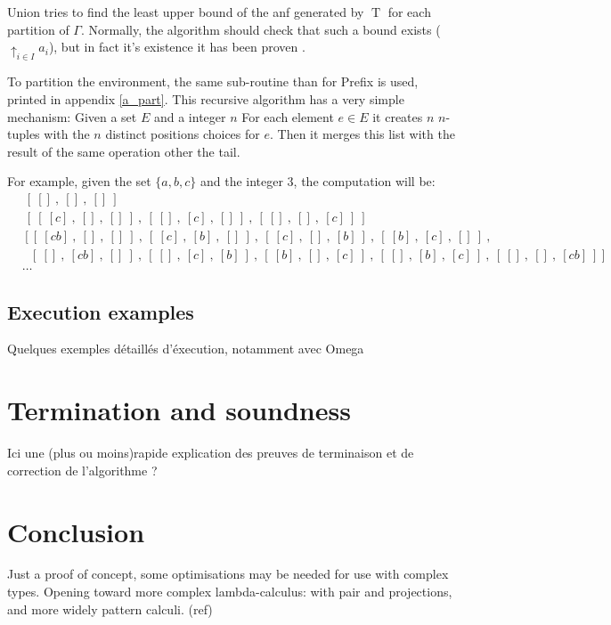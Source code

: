 \documentclass{article}
\DeclareMathOperator{\iT}{T}
\begin{document}
Union tries to find the least upper bound of the anf generated by $\iT$ for each partition of $\Gamma$. Normally, the algorithm should check that such a bound exists ($\uparrow_{i \in I}a_i$), but in fact it's existence it has been proven \cite{Kes}.

To partition the environment, the same sub-routine than for Prefix is used, printed in appendix \ref{a_part}. This recursive algorithm has a very simple mechanism:
Given a set $E$ and a integer $n$ For each element $e\in E$ it creates $n$ $n$-tuples with the $n$ distinct positions choices for $e$. Then it merges this list with the result of the same operation other the tail.

For example, given the set $\{a,b,c\}$ and the integer 3, the computation will be:
\begin{align*}
    &\ [\ []\ ,\ []\ ,\ []\ ]\ &
    \\&\ [\ [\ [c]\ ,\ []\ ,\ []\ ]\ ,\ [\ []\ ,\ [c]\ ,\ []\ ]\ ,\ [\ []\ ,\ []\ ,\ [c]\ ]\ ]\ &
    \\&\ [\ [\ [cb]\ ,\ []\ ,\ []\ ]\ ,\ [\ [c]\ ,\ [b]\ ,\ []\ ]\ ,\ [\ [c]\ ,\ []\ ,\ [b]\ ]\ ,
    \ [\ [b]\ ,\ [c]\ ,\ []\ ]\ ,&
    \\&\ \ \ [\ []\ ,\ [cb]\ ,\ []\ ]\ ,\ [\ []\ ,\ [c]\ ,\ [b]\ ]\ ,
    \ [\ [b]\ ,\ []\ ,\ [c]\ ]\ ,\ [\ []\ ,\ [b]\ ,\ [c]\ ]\ ,\ [\ []\ ,\ []\ ,\ [cb]\ ]\  ]&
    \\&\ldots&
\end{align*}

\subsection{Execution examples}
Quelques exemples détaillés d'éxecution, notamment avec Omega
\section{Termination and soundness}
Ici une (plus ou moins)rapide explication des preuves de terminaison et de correction de l'algorithme ?
\section{Conclusion}
Just a proof of concept, some optimisations may be needed for use with complex types.
Opening toward more complex lambda-calculus: with pair and projections, and more widely pattern calculi. (ref)


\newpage


\end{document}
